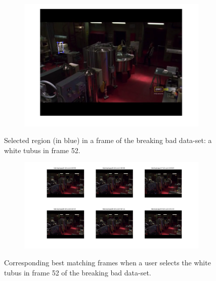 \documentclass{paper}
\begin{document}
\begin{figure}[!htbp]
\centering
\begin{subfigure}{1.0\textwidth}
\includegraphics[width=\textwidth]{figures/region_queries/bb/selectionRegQ_52}
\end{subfigure}
\caption{Selected region (in blue) in a frame of the breaking bad data-set: a white tubus in frame 52.}
\label{fig:bb_regionquery_sel1}
\end{figure}

\begin{figure}[!htbp]
\centering
\begin{subfigure}{1.0\textwidth}
\includegraphics[width=\textwidth]{figures/region_queries/bb/matchesRegQ_52}
\end{subfigure}
\caption{Corresponding best matching frames when a user selects the white tubus in frame 52 of the breaking bad data-set.}
\label{fig:bb_regionquery_matches1}
\end{figure}
\end{document}
